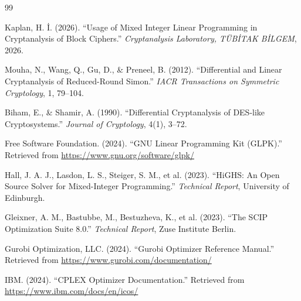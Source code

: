 \documentclass[11pt,a4paper]{article}
\begin{document}
\begin{thebibliography}{99}

Kaplan, H. İ. (2026).
``Usage of Mixed Integer Linear Programming in Cryptanalysis of Block Ciphers.''
\textit{Cryptanalysis Laboratory, TÜBİTAK BİLGEM}, 2026.


Mouha, N., Wang, Q., Gu, D., \& Preneel, B. (2012).
``Differential and Linear Cryptanalysis of Reduced-Round Simon.''
\textit{IACR Transactions on Symmetric Cryptology}, 1, 79--104.

Biham, E., \& Shamir, A. (1990).
``Differential Cryptanalysis of DES-like Cryptosystems.''
\textit{Journal of Cryptology}, 4(1), 3--72.

Free Software Foundation. (2024).
``GNU Linear Programming Kit (GLPK).''
Retrieved from \url{https://www.gnu.org/software/glpk/}

Hall, J. A. J., Lasdon, L. S., Steiger, S. M., et al. (2023).
``HiGHS: An Open Source Solver for Mixed-Integer Programming.''
\textit{Technical Report}, University of Edinburgh.

Gleixner, A. M., Bastubbe, M., Bestuzheva, K., et al. (2023).
``The SCIP Optimization Suite 8.0.''
\textit{Technical Report}, Zuse Institute Berlin.

Gurobi Optimization, LLC. (2024).
``Gurobi Optimizer Reference Manual.''
Retrieved from \url{https://www.gurobi.com/documentation/}

IBM. (2024).
``CPLEX Optimizer Documentation.''
Retrieved from \url{https://www.ibm.com/docs/en/icos/}

\end{thebibliography}
\end{document}
